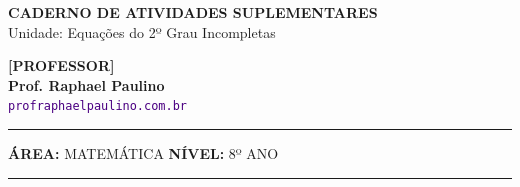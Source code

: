 \usepackage{titlesec}
\titleformat{\section}{\color{black}\large\bfseries}{\thesection}{0em}{\vspace{0.1cm}\titlerule[0.8pt]}
\titlespacing*{\section}{0pt}{10pt}{6pt} 
\titleformat{\subsubsection}[runin]{\color{black}\bfseries}{}{0em}{}
\titlespacing*{\subsubsection}{0pt}{0pt}{0.15cm}

\usepackage{multicol}
\setlength{\columnsep}{1cm}
\setlength{\columnseprule}{0.5pt}
\def\columnseprulecolor{\color{CorLinha}}
\usepackage{adjustbox, tikz, pgfplots, circuitikz}
\usetikzlibrary{shadows, shapes.misc, positioning, calc}
\pgfplotsset{compat=1.18}


\thispagestyle{empty}
\color{Cinzablack}
\vspace*{-1.8cm}

\noindent
\begin{minipage}{\textwidth}
    \selectfont
    \noindent
    \begin{minipage}[t]{0.65\linewidth}
        {\Large \bfseries \MakeUppercase{Caderno de Atividades Suplementares}}\\[0.1cm]
        {\large \textmd{\textcolor{CinzaEscuro}{Unidade: Equações do 2º Grau Incompletas}}}
    \end{minipage}%
    \begin{minipage}[t]{0.35\linewidth}
        \raggedleft
        \ifgabarito
            {\large \bfseries \textcolor{CorTitUm}{[PROFESSOR]}}\\[0.05cm]
        \fi
        \small \textbf{Prof. Raphael Paulino}\\
        \textsf{\small \textcolor{indigo}{\texttt{profraphaelpaulino.com.br}}}
    \end{minipage}
    
    \vspace{0.15cm}
    \noindent\rule{\linewidth}{1.2pt}
    \vspace{-0.1cm}
    \footnotesize\textsf{\textbf{ÁREA:} MATEMÁTICA \hfill \textbf{NÍVEL:} 8º ANO}
    \vspace{0.1cm}
    \noindent\rule{\linewidth}{0.4pt}
\end{minipage}

